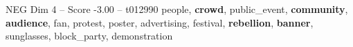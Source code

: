 \begin{textsample}{NEG Dim 4 – Score -3.00 – t012990}  \label{ex:f4_neg_004}
people, \textbf{crowd}, public\_event, \textbf{community}, \textbf{audience}, fan, protest, poster, advertising, festival, \textbf{rebellion}, \textbf{banner}, sunglasses, block\_party, demonstration

\end{textsample}
